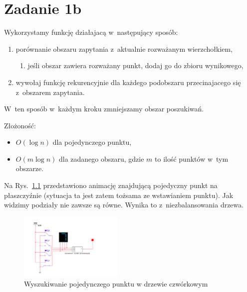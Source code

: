 \documentclass[12pt,a4paper,openright]{mwrep}
\begin{document}
\chapter{Zadanie 1b}


Wykorzystamy funkcję działajacą w~następujący sposób:
    \begin{enumerate}
        \item porównanie obszaru zapytania z~aktualnie rozważanym wierzchołkiem,
        \begin{enumerate}
            \item jeśli obszar zawiera rozważany punkt, dodaj go do zbioru wynikowego,
        \end{enumerate}
        \item wywołaj funkcję rekurencyjnie dla każdego podobszaru przecinajacego się
        z~obszarem zapytania.
    \end{enumerate}
W~ten sposób w~każdym kroku zmniejszamy obszar poszukiwań.

Złożoność:
\begin{itemize}
    \item $O(\log n)$ dla pojedynczego punktu,
    \item $O(m\log n)$ dla zadanego obszaru, gdzie $m$ to ilość punktów w~tym obszarze.
\end{itemize}

Na Rys.~\ref{rys:example_picture} przedstawiono animację znajdującą pojedyczny punkt na płaszczyźnie
(sytuacja ta jest zatem tożsama ze wstawianiem punktu).
Jak widzimy podziały nie zawsze są równe.
Wynika to z~niezbalansowania drzewa.

\begin{figure}[h]
    \includegraphics[width=0.44\textwidth]{images/example.png}
    \caption{Wyszukiwanie pojedynczego punktu w drzewie czwórkowym}
    \label{rys:example_picture}
\end{figure}
\end{document}
